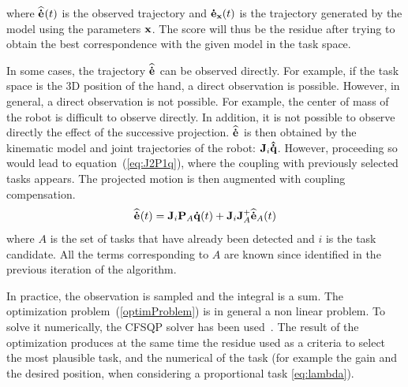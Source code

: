 \documentclass[letterpaper, 10pt, conference]{ieeeconf}      %
\begin{document}
\noindent where ${\mathbf{\widehat{\dot{e}}}}_{}(t)$ is the observed trajectory and ${\mathbf{\dot{e}}}_{{\mathbf{x}}}(t)$ is the trajectory
generated by the model using the parameters ${\mathbf{x}}$.
The score will thus be the residue after trying to obtain the best correspondence with the given
model in the task space.

In some cases, the trajectory ${\mathbf{\widehat{\dot{e}}}}_{}$ can be observed directly. For example, if the task space 
is the 3D position of the hand, a direct observation is possible.
However, in general, a direct observation is not possible. For example,
the center of mass of the robot is difficult to observe directly. 
In addition, it is not possible to observe directly the effect of the successive projection. 
${\mathbf{\widehat{\dot{e}}}}_{}$ is then obtained by the kinematic model and 
joint trajectories of the robot: ${\mathbf{J}}_i{\mathbf{\hat{\dot{q}}}}$.
However, proceeding so would lead to equation~(\ref{eq:J2P1q}), where the coupling with previously
selected tasks appears. The projected motion is then augmented with coupling compensation.
\begin{equation}
  {\mathbf{\widehat{\dot{e}}}}_{}(t) = {\mathbf{J}}_i{\mathbf{P}}_A {\mathbf{\dot{q}}}(t) + {\mathbf{J}}_i{\mathbf{J}}_A^+{\mathbf{\widehat{\dot{e}}}}_{A}(t)
  \label{eq:compensation}
\end{equation}
where $A$ is the set of tasks that have already been detected and $i$ is the task candidate.
All the terms corresponding to $A$ are known since identified in the previous
iteration of the algorithm.


\medskip
In practice, the observation is sampled and the integral is a sum.
The optimization problem~(\ref{optimProblem}) is in general a non linear problem. To solve
it numerically, the CFSQP solver has been used~\cite{lawrence97}. The result of the optimization produces at the same time the residue used as a criteria to select the most plausible task, and the numerical of the task (for example the gain and the desired position, when considering a proportional task \eqref{eq:lambda}).
\end{document}
